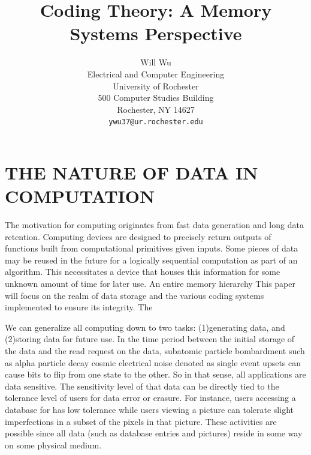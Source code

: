 \documentclass[letterpaper, 10 pt, conference]{ieeeconf}
\title{\LARGE \bf
Coding Theory: A Memory Systems Perspective
}
\author{ \parbox{3 in}{\centering Will Wu\\
        Electrical and Computer Engineering\\
        University of Rochester\\
        500 Computer Studies Building \\
        Rochester, NY 14627\\
        {\tt\small ywu37@ur.rochester.edu}}
}
\begin{document}
\maketitle
\thispagestyle{empty}
\pagestyle{empty}







\section{THE NATURE OF DATA IN COMPUTATION}

The motivation for computing originates from fast data generation and long data retention.  Computing devices are designed to precisely return outputs of functions built from computational primitives given inputs.  Some pieces of data may be reused in the future for a logically sequential computation as part of an algorithm.  This necessitates a device that houses this information for some unknown amount of time for later use.  An entire memory hierarchy This paper will focus on the realm of data storage and the various coding systems implemented to ensure its integrity.  The 

We can generalize all computing down to two tasks: (1)generating data, and (2)storing data for future use.  In the time period between the initial storage of the data and the read request on the data, subatomic particle bombardment such as alpha particle decay cosmic electrical noise denoted as single event upsets can cause bits to flip from one state to the other. \cite{Jacob}   So in that sense, all applications are data sensitive.  The sensitivity level of that data can be directly tied to the tolerance level of users for data error or erasure.  For instance, users accessing a database for has low tolerance while users viewing a picture can tolerate slight imperfections in a subset of the pixels in that picture.  These activities are possible since all data (such as database entries and pictures) reside in some way on some physical medium.
\end{document}
